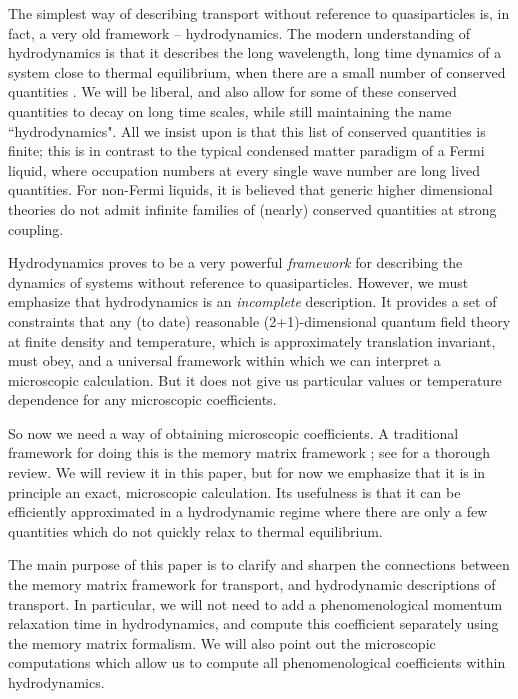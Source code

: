 \documentclass[10pt, oneside]{book}
\begin{document}
\begin{doublespace}
The simplest way of describing transport without reference to quasiparticles is, in fact, a very old framework -- hydrodynamics.    The modern understanding of hydrodynamics is that it describes the long wavelength, long time dynamics of a system close to thermal equilibrium, when there are a small number of conserved quantities \cite{Kadanoff1963419}.      We will be liberal, and also allow for some of these conserved quantities to decay on long time scales, while still maintaining the name ``hydrodynamics".    All we insist upon is that this list of conserved quantities is finite; this is in contrast to the typical condensed matter paradigm of a Fermi liquid, where occupation numbers at every single wave number are long lived quantities. For non-Fermi liquids, 
it is believed that generic higher dimensional  theories do not admit infinite families of (nearly) conserved quantities at strong coupling.

 Hydrodynamics proves to be a very powerful \emph{framework} for describing the dynamics of systems without reference to quasiparticles.    However, we must emphasize that hydrodynamics is an \emph{incomplete} description.   It provides a set of constraints that any (to date) reasonable (2+1)-dimensional quantum field theory at finite density and temperature, which is approximately translation invariant, must obey, and a universal framework within which we can interpret a microscopic calculation.    But it does not give us particular values or temperature dependence for any microscopic coefficients.    

So now we need a way of obtaining microscopic coefficients.    A traditional framework for doing this is the memory matrix framework \cite{zwanzig, mori}; see \cite{forster1995} for a thorough review.   We will review it in this paper, but for now we emphasize that it is in principle an exact, microscopic calculation.  Its usefulness is that it can be efficiently approximated in a hydrodynamic regime where there are only a few quantities which do not quickly relax to thermal equilibrium.   

The main purpose of this paper is to clarify and sharpen the connections between the memory matrix framework for transport, and hydrodynamic descriptions of transport.  In particular, we will not need to add a phenomenological momentum relaxation time in hydrodynamics, and compute this coefficient separately using the memory matrix formalism.    We will also point out the microscopic computations which  allow us to compute all phenomenological coefficients within hydrodynamics.


\end{doublespace}
\end{document}
